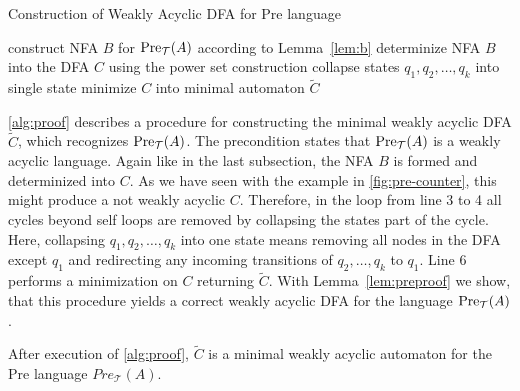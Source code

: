 \begin{algorithm}[H]
\caption{Construction of Weakly Acyclic DFA for Pre language}\label{alg:proof}
\begin{algorithmic}[1]
\State construct NFA $B$ for $\operatorname{\text{Pre}}_{\mathcal{T}}(A)$ according to Lemma~\ref{lem:b}
\State determinize NFA $B$ into the DFA $C$ using the power set construction
\State collapse states $q_{1},q_{2},\dots,q_{k}$ into single state
\EndWhile
\State minimize $C$ into minimal automaton $\widetilde{C}$
\end{algorithmic}
\end{algorithm}

\autoref{alg:proof} describes a procedure for constructing the minimal weakly acyclic DFA $\widetilde{C}$, which recognizes $\operatorname{\text{Pre}}_{\mathcal{T}}(A)$. The precondition states that $\operatorname{\text{Pre}}_{\mathcal{T}}(A)$ is a weakly acyclic language. Again like in the last subsection, the NFA $B$ is formed and determinized into $C$. As we have seen with the example in \autoref{fig:pre-counter}, this might produce a not weakly acyclic $C$. Therefore, in the loop from line 3 to 4 all cycles beyond self loops are removed by collapsing the states part of the cycle. Here, collapsing $q_{1},q_{2},\dots,q_{k}$ into one state means removing all nodes in the DFA except $q_{1}$ and redirecting any incoming transitions of $q_{2},\dots,q_{k}$ to $q_{1}$. Line 6 performs a minimization on $C$ returning $\widetilde{C}$.
With Lemma~\autoref{lem:preproof} we show, that this procedure yields a correct weakly acyclic DFA for the language $\operatorname{\text{Pre}}_{\mathcal{T}}(A)$.

\begin{lemma}\label{lem:preproof}
After execution of \autoref{alg:proof}, $\widetilde{C}$ is a minimal weakly acyclic automaton for the Pre language $Pre_{\mathcal{T}}(A)$.
\end{lemma}

